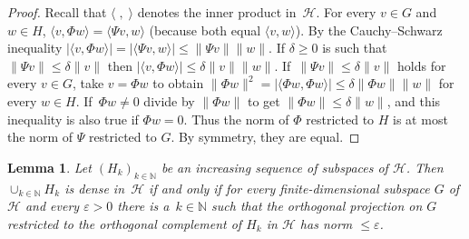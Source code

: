 \documentclass[pdftex]{sigma}%
\newcommand{\hilH}{\mathcal H}
\newcommand{\norm}[1]{\lVert #1\rVert}
\newcommand{\aver}[1]{\langle #1 \rangle}
\newcommand{\kN}{k\in \mathbb{N}}
\newtheorem{Lemma}[Theorem]{Lemma}
\begin{document}
\begin{proof}
Recall that $\aver{\; , \;}$ denotes the inner product in~$\hilH$. For every $v\in G$ and $w\in H$, $\aver{v,\Phi w}=\aver{\Psi v,w}$ (because both equal $\aver{v,w}$). By the Cauchy--Schwarz inequality $|\aver{v,\Phi w}|=|\aver{\Psi v,w}| \leq \norm{\Psi v} \norm{w}$. If $\delta\geq 0$ is such that $\norm{\Psi v}\leq \delta \norm{v}$ then $|\aver{v,\Phi w}|\leq \delta \norm{v} \norm{w}$. If~$\norm{\Psi v}\leq \delta \norm{v}$ holds for every $v\in G$, take $v=\Phi w$ to obtain $\norm{\Phi w}^2=|\aver{\Phi w,\Phi w}|\leq \delta \norm{\Phi w} \norm{w}$ for every $w\in H$. If~$\Phi w\neq 0$ divide by $\norm{\Phi w}$ to get $\norm{\Phi w}\leq \delta \norm{w}$, and this inequality is also true if $\Phi w= 0$. Thus the norm of $\Phi$ restricted to $H$ is at most the norm of $\Psi$ restricted to $G$. By symmetry, they are equal.
\end{proof}

\begin{Lemma} \label{lem:densecharac}
Let $(H_k)_{\kN}$ be an increasing sequence of subspaces of $\hilH$. Then $\cup_{\kN} H_k$ is dense in~$\hilH$ if and only if for every finite-dimensional subspace $G$ of $\hilH$ and every $\varepsilon >0$ there is a~$\kN$ such that the orthogonal projection on $G$ restricted to the orthogonal complement of $H_k$ in $\hilH$ has norm $\leq \varepsilon$.
\end{Lemma}
\end{document}
